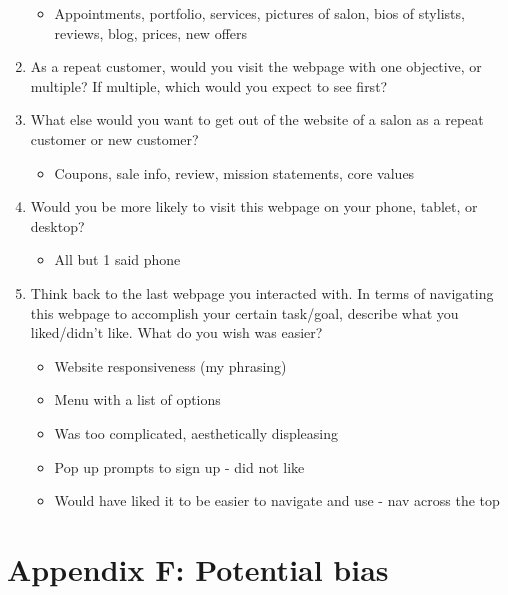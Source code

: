 \begin{enumerate}
\begin{itemize}
  \item
    Appointments, portfolio, services, pictures of salon, bios of stylists, reviews, blog, prices, new offers
  \end{itemize}
\item
  As a repeat customer, would you visit the webpage with one objective, or multiple? If multiple, which would you expect to see first?
\item
  What else would you want to get out of the website of a salon as a repeat customer or new customer?
  \begin{itemize}
  \item
    Coupons, sale info, review, mission statements, core values
  \end{itemize}
\item
  Would you be more likely to visit this webpage on your phone, tablet, or desktop?
  \begin{itemize}
  \item
    All but 1 said phone
  \end{itemize}
\item
  Think back to the last webpage you interacted with. In terms of navigating this webpage to accomplish your certain task/goal, describe what you liked/didn't like. What do you wish was easier?
  \begin{itemize}
  \item
    Website responsiveness (my phrasing)
  \item
    Menu with a list of options
  \item
    Was too complicated, aesthetically displeasing
  \item
    Pop up prompts to sign up - did not like
  \item
    Would have liked it to be easier to navigate and use - nav across the top
  \end{itemize}
\end{enumerate}


\section{Appendix F: Potential bias}

